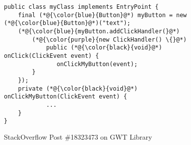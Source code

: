 \begin{figure}[htbp]
	\centering
\begin{lstlisting}[]
public class myClass implements EntryPoint {
    final (*@{\color{blue}{Button}@*) myButton = new (*@{\color{blue}{Button}@*)("text");
    (*@{\color{blue}{myButton.addClickHandler(}@*)
        (*@{\color{purple}{new ClickHandler() \{}@*)
            public (*@{\color{black}{void}@*) onClick(ClickEvent event) {
               onClickMyButton(event);
        }
    });
    private (*@{\color{black}{void}@*) onClickMyButton(ClickEvent event) {
            ... 
    }
}
\end{lstlisting}
        \vspace{-12pt}
        \caption{StackOverflow Post \#18323473 on GWT Library}
        \label{fig:example2}
\end{figure}
